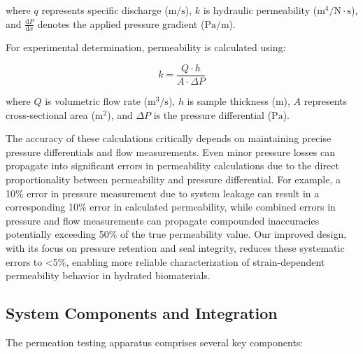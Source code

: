 where $q$ represents specific discharge ($\mathrm{m/s}$), $k$ is hydraulic permeability ($\mathrm{m^4/N \cdot s}$), and $\frac{\mathrm{d}P}{\mathrm{d}x}$ denotes the applied pressure gradient ($\mathrm{Pa/m}$).

For experimental determination, permeability is calculated using:

\begin{equation}
    k = \frac{Q \cdot h}{A \cdot \Delta P}
\end{equation}

where $Q$ is volumetric flow rate ($\mathrm{m}^3/\mathrm{s}$), $h$ is sample thickness ($\mathrm{m}$), $A$ represents cross-sectional area ($\mathrm{m}^2$), and $\Delta P$ is the pressure differential ($\mathrm{Pa}$).

The accuracy of these calculations critically depends on maintaining precise pressure differentials and flow measurements. Even minor pressure losses can propagate into significant errors in permeability calculations due to the direct proportionality between permeability and pressure differential. For example, a 10\% error in pressure measurement due to system leakage can result in a corresponding 10\% error in calculated permeability, while combined errors in pressure and flow measurements can propagate compounded inaccuracies potentially exceeding 50\% of the true permeability value. Our improved design, with its focus on pressure retention and seal integrity, reduces these systematic errors to <5\%, enabling more reliable characterization of strain-dependent permeability behavior in hydrated biomaterials.

\subsection{System Components and Integration}

The permeation testing apparatus comprises several key components:

